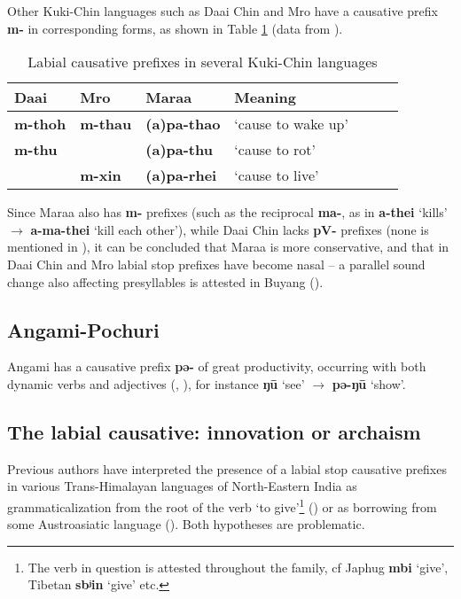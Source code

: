 \documentclass[oneside,a4paper,11pt]{article}
\newcommand{\ipa}[1]{\textbf{{\phon\mbox{#1}}}} %
\begin{document}
Other Kuki-Chin languages such as Daai Chin and Mro have a causative prefix \ipa{m-} in corresponding forms, as shown in Table \ref{tab:kukichin}  (data from \citealt[139]{hartmann01prenasalization}).

\begin{table}[H]
\caption{Labial causative prefixes in several Kuki-Chin languages} \centering \label{tab:kukichin}
\begin{tabular}{lllllll}
\toprule
Daai & Mro & Maraa & Meaning \\
\midrule
\ipa{m-thoh}  &\ipa{m-thau}  & \ipa{(a)pa-thao} & `cause to wake up' \\
\ipa{m-thu}  &  & \ipa{(a)pa-thu} & `cause to rot' \\
&\ipa{m-xin}  & \ipa{(a)pa-rhei} & `cause to live' \\
\bottomrule
\end{tabular}
\end{table}

Since Maraa also has \ipa{m-} prefixes (such as the reciprocal \ipa{ma-}, as in \ipa{a-thei} `kills' $\rightarrow$ \ipa{a-ma-thei} `kill each other'), while Daai Chin lacks \ipa{pV-} prefixes (none is mentioned in \citealt{hartmann09grammar}), it can be concluded that Maraa is more conservative, and that in Daai Chin and Mro labial stop prefixes have become nasal -- a parallel sound change also affecting presyllables is attested in Buyang (\citealt{jacques17buyang}).

\subsection{Angami-Pochuri}
Angami has a causative prefix \ipa{pə-} of great productivity, occurring with both dynamic verbs and adjectives (\citealt[132-3]{matisoff03}, \citet[66-67]{giridhar80angami}), for instance \ipa{ŋū} `see' $\rightarrow$ \ipa{pə-ŋū} `show'.

\subsection{The labial causative: innovation or archaism} \label{sec:innovation}
Previous authors have interpreted the presence of a labial stop causative prefixes in various Trans-Himalayan languages of North-Eastern India as  grammaticalization from the root of the verb `to give'\footnote{The verb in question is attested throughout the family, cf Japhug \ipa{mbi} `give', Tibetan \ipa{sbʲin} `give' etc.}
(\citealt[132]{matisoff03}) or as borrowing from some Austroasiatic language (\citealt{maspero46, konnerth15cisloc, delancey15adjectival}). Both hypotheses are problematic. 
\end{document}
